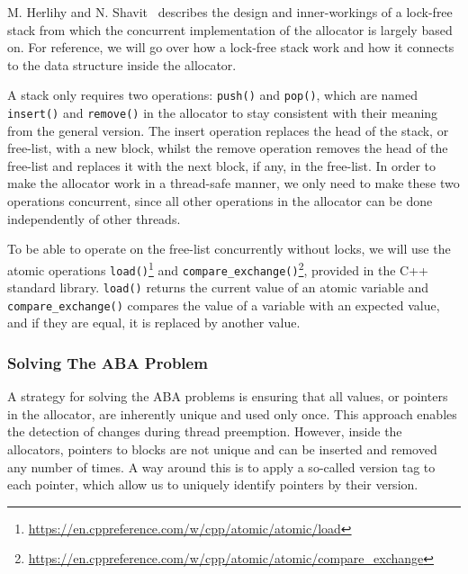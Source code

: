 M. Herlihy and N. Shavit~\cite[Chapter 11]{artofmpprogramming} describes the design and inner-workings of a lock-free stack from which the concurrent implementation of the allocator is largely based on. For reference, we will go over how a lock-free stack work and how it connects to the data structure inside the allocator.

A stack only requires two operations: \texttt{push()} and \texttt{pop()}, which are named \texttt{insert()} and \texttt{remove()} in the allocator to stay consistent with their meaning from the general version. The insert operation replaces the head of the stack, or free-list, with a new block, whilst the remove operation removes the head of the free-list and replaces it with the next block, if any, in the free-list. In order to make the allocator work in a thread-safe manner, we only need to make these two operations concurrent, since all other operations in the allocator can be done independently of other threads.

To be able to operate on the free-list concurrently without locks, we will use the atomic operations \texttt{load()}\footnote{\url{https://en.cppreference.com/w/cpp/atomic/atomic/load}} and \texttt{compare\_exchange()}\footnote{\url{https://en.cppreference.com/w/cpp/atomic/atomic/compare_exchange}}, provided in the C++ standard library. \texttt{load()} returns the current value of an atomic variable and \texttt{compare\_exchange()} compares the value of a variable with an expected value, and if they are equal, it is replaced by another value.

\subsubsection{Solving The ABA Problem}


A strategy for solving the ABA problems is ensuring that all values, or pointers in the allocator, are inherently unique and used only once. This approach enables the detection of changes during thread preemption. However, inside the allocators, pointers to blocks are not unique and can be inserted and removed any number of times. A way around this is to apply a so-called version tag to each pointer, which allow us to uniquely identify pointers by their version.

